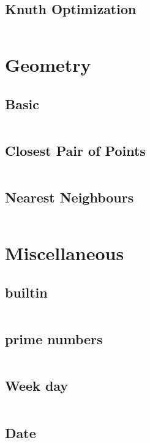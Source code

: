 \documentclass[a4paper, 10pt, twocolumn, landscape]{article}
\begin{document}
  \subsection{Knuth Optimization}
  \inputminted{cpp}{dynamic-programming/knuth-optimization.cpp}

  \section{Geometry}
  \subsection{Basic}
  \inputminted{cpp}{geometry/basics.cpp}
  \subsection{Closest Pair of Points}
  \inputminted{cpp}{geometry/closest-pair.cpp}
  \subsection{Nearest Neighbours}
  \inputminted{cpp}{geometry/neighbour.cpp}

  \section{Miscellaneous}
  \subsection{builtin}
  \inputminted{cpp}{misc/builtin.cpp}
  \subsection{prime numbers}
  \inputminted{text}{misc/prime-numbers.txt}
  \subsection{Week day}
  \inputminted{cpp}{misc/week-day.cpp}
  \subsection{Date}
  \inputminted{cpp}{misc/date.cpp}
\end{document}
